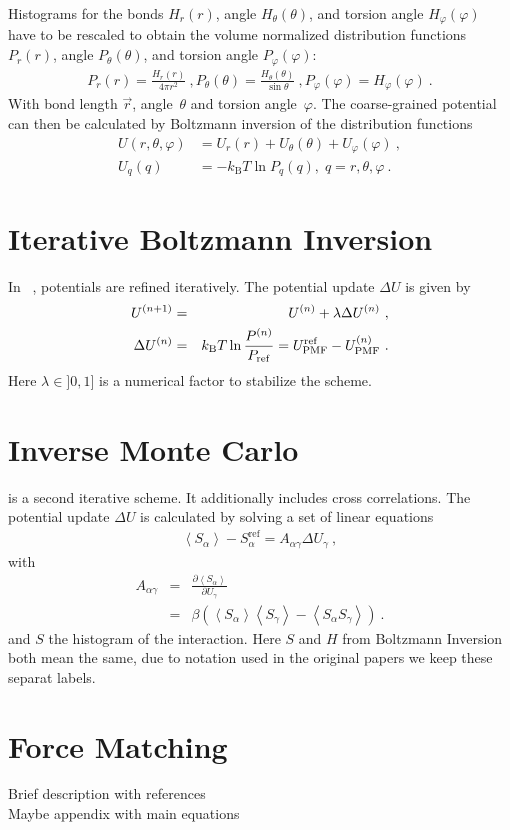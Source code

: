 Histograms for the bonds $H_r(r)$, angle $H_\theta(\theta)$, and torsion angle $H_\varphi(\varphi)$ have to be rescaled to obtain the volume normalized distribution functions $P_r(r)$, angle $P_\theta(\theta)$, and torsion angle $P_\varphi(\varphi)$: 
%
\begin{align}
    P_r(r) = \frac{H_r(r)}{4\pi r^2}~,
    P_\theta(\theta) = \frac{H_\theta(\theta)}{\sin \theta}~,
    P_\varphi(\varphi) = H_\varphi (\varphi)~.
    \label{eq:boltzmann_norm}
\end{align}
With bond length $\vec{r}$, angle~$\theta$ and torsion angle~$\varphi$.%
The coarse-grained potential can then be calculated by Boltzmann inversion of the distribution functions
%
\begin{align}
    \label{eq:boltzmann_pmf}
    U({r}, \theta, \varphi) &= U_r({r}) + U_{\theta}(\theta) + U_{\varphi}(\varphi)~, \\
    U_q({q}) &= - k_\text{B} T \ln P_q( q ),\; q=r, \theta, \varphi~.
    \nonumber
\end{align}

\section{Iterative Boltzmann Inversion}
In \ibi~\cite{Reith:2003}, potentials are refined iteratively. The potential update $\Delta U$ is given by
\begin{eqnarray}
  \label{eq:iter_boltzmann}
  U^{(n+1)} &=& U^{(n)} + \lambda \Delta U^{(n)}~, \\
  \Delta U^{(n)} &=&  k_\text{B} T \ln  \frac{P^{(n)}}{P_{\rm ref}}
  =  U_\text{PMF}^\text{ref} - U_\text{PMF}^{(n)}~.
\end{eqnarray}
Here $\lambda \in ]0,1]$ is a numerical factor to stabilize the scheme.

\section{Inverse Monte Carlo}
\imc is a second iterative scheme. It additionally includes cross correlations. The potential update $\Delta U$ is calculated by solving a set of linear equations
\begin{align}
    \left<S_{\alpha}\right> - S_{\alpha}^{\text{ref}}= A_{\alpha \gamma} \Delta U_{\gamma}~,
  \label{eq:imc}
\end{align}
%
with
\begin{eqnarray}
  \label{eq:covariance}
  A_{\alpha \gamma} &=& \frac{\partial \left< S_{\alpha} \right> }{\partial U_{\gamma}}  \\
  \nonumber
  &=&
  \beta \left( \left<S_{\alpha} \right>\left<S_{\gamma} \right> - \left<S_{\alpha} S_{\gamma} \right>  \right)~.
  \nonumber
\end{eqnarray}
and $S$ the histogram of the interaction. Here $S$ and $H$ from Boltzmann Inversion both mean the same, due to notation used in the original papers we keep these separat labels.

\section{Force Matching}
\sasha

Brief description with references \\
Maybe appendix with main equations \\
